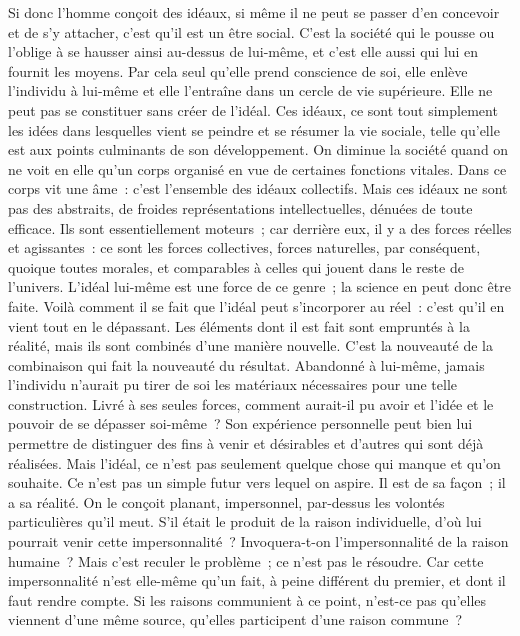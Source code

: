 \documentclass[french,twoside]{book} %
\begin{document}
Si donc l’homme conçoit des idéaux, si même il ne peut se passer d’en concevoir et de s’y attacher, c’est qu’il est un être social. C’est la société qui le pousse ou l’oblige à se hausser ainsi au-dessus de lui-même, et c’est elle aussi qui lui en fournit les moyens. Par cela seul qu’elle prend conscience de soi, elle enlève l’individu à lui-même et elle l’entraîne dans un cercle de vie supérieure. Elle ne peut pas se constituer sans créer de l’idéal. Ces idéaux, ce sont tout simplement les idées dans lesquelles vient se peindre et se résumer la vie sociale, telle qu’elle est aux points culminants de son développement. On diminue la société quand on ne voit en elle qu’un corps organisé en vue de certaines fonctions vitales. Dans ce corps vit une âme : c’est l’ensemble des idéaux collectifs. Mais ces idéaux ne sont pas des abstraits, de froides représentations intellectuelles, dénuées de toute efficace. Ils sont essentiellement moteurs ; car derrière eux, il y a des forces réelles et agissantes : ce sont les forces collectives, forces naturelles, par conséquent, quoique toutes morales, et comparables à celles qui jouent dans le reste de l’univers. L’idéal lui-même est une force de ce genre ; la science en peut donc être faite. Voilà comment il se fait que l’idéal peut s’incorporer au réel : c’est qu’il en vient tout en le dépassant. Les éléments dont il est fait sont empruntés à la réalité, mais ils sont combinés d’une manière nouvelle. C’est la nouveauté de la combinaison qui fait la nouveauté du résultat. Abandonné à lui-même, jamais l’individu n’aurait pu tirer de soi les matériaux nécessaires pour une telle construction. Livré à ses seules forces, comment aurait-il pu avoir et l’idée et le pouvoir de se dépasser soi-même ? Son expérience personnelle peut bien lui permettre de distinguer des fins à venir et désirables et d’autres qui sont déjà réalisées. Mais l’idéal, ce n’est pas seulement quelque chose qui manque et qu’on souhaite. Ce n’est pas un simple futur vers lequel on aspire. Il est de sa façon ; il a sa réalité. On le conçoit planant, impersonnel, par-dessus les volontés particulières qu’il meut. S’il était le produit de la raison individuelle, d’où lui pourrait venir cette impersonnalité ? Invoquera-t-on l’impersonnalité de la raison humaine ? Mais c’est reculer le problème ; ce n’est pas le résoudre. Car cette impersonnalité n’est elle-même qu’un fait, à peine différent du premier, et dont il faut rendre compte. Si les raisons communient à ce point, n’est-ce pas qu’elles viennent d’une même source, qu’elles participent d’une raison commune ?\par
\end{document}

